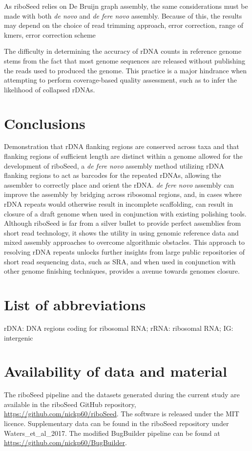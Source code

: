 \documentclass[10pt]{article}
\begin{document}
\begin{linenumbers}
As riboSeed relies on De Bruijn graph assembly, the same considerations must be made with both \textit{de novo} and \textit{de fere novo} assembly. Because of this, the results may depend on the choice of read trimming approach, error correction, range of kmers, error correction scheme

The difficulty in determining the accuracy of rDNA counts in reference genome stems from the fact that most genome sequences are released without publishing the reads used to produced the genome. This practice is a major hindrance when attempting to perform coverage-based quality assessment, such as to infer the likelihood of collapsed rDNAs.




\section*{Conclusions}
Demonstration that rDNA flanking regions are conserved across taxa and that flanking regions of sufficient length are distinct within a genome allowed for the development of riboSeed, a \textit{de fere novo} assembly method utilizing rDNA flanking regions to act as barcodes for the repeated rDNAs, allowing the assembler to correctly place and orient the rDNA. \textit{de fere novo} assembly can improve the assembly by bridging across ribosomal regions, and, in cases where rDNA repeats would otherwise result in incomplete scaffolding, can result in closure of a draft genome when used in conjunction with existing polishing tools. Although riboSeed is far from a silver bullet to provide perfect assemblies from short read technology, it shows the utility in using genomic reference data and mixed assembly approaches to overcome algorithmic obstacles. This approach to resolving rDNA repeats unlocks further insights from large public repositories of short read sequencing data, such as SRA, and when used in conjunction with other genome finishing techniques, provides a avenue towards genomes closure.

\end{linenumbers}
\baselineskip13pt

\section*{List of abbreviations}
rDNA: DNA regions coding for ribosomal RNA; rRNA: ribosomal RNA; IG: intergenic


\section*{Availability of data and material}
The riboSeed pipeline and the datasets generated during the current study are available in the riboSeed GitHub repository, \url{https://github.com/nickp60/riboSeed}. The software is released under the MIT licence. Supplementary data can be found in the riboSeed repository under Waters\_et\_al\_2017. The modified BugBuilder pipeline can be found at \url{https://github.com/nickp60/BugBuilder}.
\end{document}
